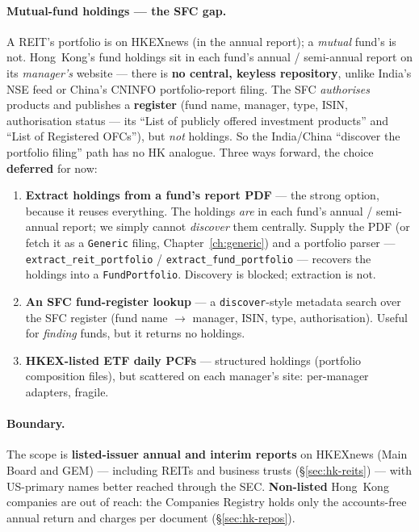 \documentclass[11pt,a4paper]{report}
\begin{document}
\paragraph{Mutual-fund holdings --- the SFC gap.} A REIT's portfolio is on HKEXnews (in the annual report); a
\emph{mutual} fund's is not. Hong~Kong's fund holdings sit in each fund's annual / semi-annual report on its
\emph{manager's} website --- there is \textbf{no central, keyless repository}, unlike India's NSE feed or
China's CNINFO portfolio-report filing. The SFC \emph{authorises} products and publishes a \textbf{register}
(fund name, manager, type, ISIN, authorisation status --- its ``List of publicly offered investment products''
and ``List of Registered OFCs''), but \emph{not} holdings. So the India/China ``discover the portfolio filing''
path has no HK analogue. Three ways forward, the choice \textbf{deferred} for now:
\begin{enumerate}[nosep]
  \item \textbf{Extract holdings from a fund's report PDF} --- the strong option, because it reuses everything.
    The holdings \emph{are} in each fund's annual / semi-annual report; we simply cannot \emph{discover} them
    centrally. Supply the PDF (or fetch it as a \texttt{Generic} filing, Chapter~\ref{ch:generic}) and a
    portfolio parser --- \texttt{extract\_reit\_portfolio} / \texttt{extract\_fund\_portfolio} --- recovers the
    holdings into a \texttt{FundPortfolio}. Discovery is blocked; extraction is not.
  \item \textbf{An SFC fund-register lookup} --- a \texttt{discover}-style metadata search over the SFC register
    (fund name $\to$ manager, ISIN, type, authorisation). Useful for \emph{finding} funds, but it returns no
    holdings.
  \item \textbf{HKEX-listed ETF daily PCFs} --- structured holdings (portfolio composition files), but scattered
    on each manager's site: per-manager adapters, fragile.
\end{enumerate}

\paragraph{Boundary.} The scope is \textbf{listed-issuer annual and interim reports} on HKEXnews (Main Board
and GEM) --- including REITs and business trusts (\S\ref{sec:hk-reits}) --- with US-primary names better
reached through the SEC. \textbf{Non-listed} Hong~Kong companies are out of reach: the Companies Registry holds
only the accounts-free annual return and charges per document (\S\ref{sec:hk-repos}).
\end{document}

